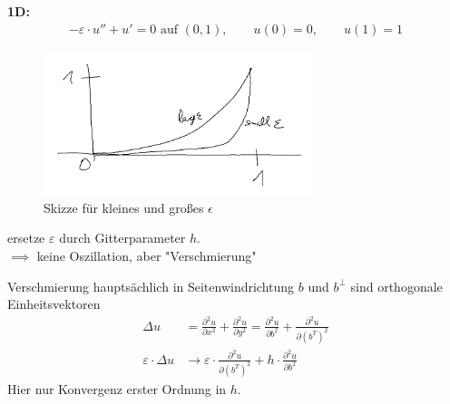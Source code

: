 \textbf{1D:}
\begin{align*}
	-\varepsilon\cdot u''+u'=0\text{ auf }(0,1),\qquad u(0)=0,\qquad u(1)=1
\end{align*}
\begin{figure}[!ht]
	\begin{center}
		\includegraphics[width=0.7\textwidth]{pics/Sketch16.png}
		\caption{Skizze für kleines und großes $\epsilon$}
		\label{AbbEinfachesStromlinienProblem}
	\end{center}
\end{figure}

ersetze $\varepsilon$ durch Gitterparameter $h$.\\
$\implies$ keine Oszillation, aber "Verschmierung" %

Verschmierung hauptsächlich in Seitenwindrichtung
$b$ und $b^\perp$ sind orthogonale Einheitsvektoren
\begin{align*}
	\Delta u&=\frac{\partial^2 u}{\partial x^2}+\frac{\partial^2 u}{\partial y^2}
	=\frac{\partial^2 u}{\partial b^2}+\frac{\partial^2 u}{\partial (b^T)^2}\\
	\varepsilon\cdot\Delta u&\to\varepsilon\cdot\frac{\partial^2 u}{\partial(b^T)^2}+h\cdot\frac{\partial^2 u}{\partial b^2}
\end{align*}
Hier nur Konvergenz erster Ordnung in $h$.
